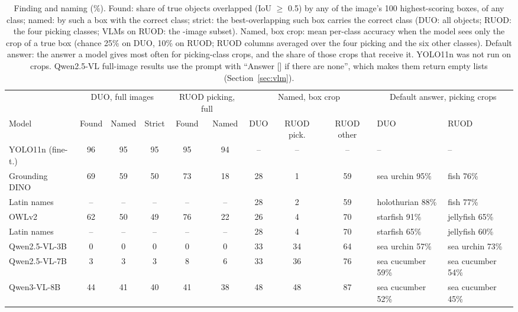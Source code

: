 \begin{table}[t]
\centering
\small
\setlength{\tabcolsep}{2.0pt}
\begin{tabular}{lccccccccll}
\toprule
 & \multicolumn{3}{c}{DUO, full images} & \multicolumn{2}{c}{RUOD picking, full} & \multicolumn{3}{c}{Named, box crop} & \multicolumn{2}{c}{Default answer, picking crops} \\
\cmidrule(lr){2-4}\cmidrule(lr){5-6}\cmidrule(lr){7-9}\cmidrule(lr){10-11}
Model & Found & Named & Strict & Found & Named & DUO & RUOD pick. & RUOD other & DUO & RUOD \\
\midrule
YOLO11n (fine-t.) & 96 & 95 & 95 & 95 & 94 & -- & -- & -- & -- & -- \\
\midrule
Grounding DINO & 69 & 59 & 50 & 73 & 18 & 28 & 1 & 59 & sea urchin 95\% & fish 76\% \\
\quad Latin names & -- & -- & -- & -- & -- & 28 & 2 & 59 & holothurian 88\% & fish 77\% \\
OWLv2 & 62 & 50 & 49 & 76 & 22 & 26 & 4 & 70 & starfish 91\% & jellyfish 65\% \\
\quad Latin names & -- & -- & -- & -- & -- & 28 & 4 & 70 & starfish 65\% & jellyfish 60\% \\
\midrule
Qwen2.5-VL-3B & 0 & 0 & 0 & 0 & 0 & 33 & 34 & 64 & sea urchin 57\% & sea urchin 73\% \\
Qwen2.5-VL-7B & 3 & 3 & 3 & 8 & 6 & 33 & 36 & 76 & sea cucumber 59\% & sea cucumber 54\% \\
Qwen3-VL-8B & 44 & 41 & 40 & 41 & 38 & 48 & 48 & 87 & sea cucumber 52\% & sea cucumber 45\% \\
\bottomrule
\end{tabular}
\caption{Finding and naming (\%). Found: share of true objects overlapped (IoU $\geq$ 0.5) by any of the image's 100 highest-scoring boxes, of any class; named: by such a box with the correct class; strict: the best-overlapping such box carries the correct class (DUO: all objects; RUOD: the four picking classes; VLMs on RUOD: the \rSubset-image subset). Named, box crop: mean per-class accuracy when the model sees only the crop of a true box (chance 25\% on DUO, 10\% on RUOD; RUOD columns averaged over the four picking and the six other classes). Default answer: the answer a model gives most often for picking-class crops, and the share of those crops that receive it. YOLO11n was not run on crops. Qwen2.5-VL full-image results use the prompt with ``Answer [] if there are none'', which makes them return empty lists (Section~\ref{sec:vlm}).}
\label{tab:naming}
\end{table}
